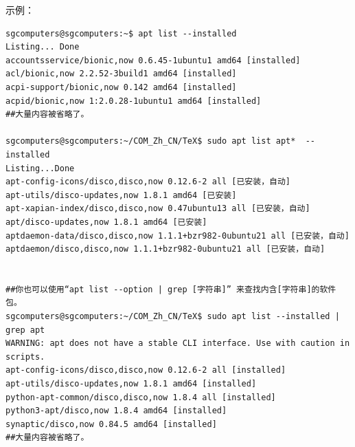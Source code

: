 \documentclass{book}
\begin{document}
示例：
\begin{verbatim}
sgcomputers@sgcomputers:~$ apt list --installed
Listing... Done
accountsservice/bionic,now 0.6.45-1ubuntu1 amd64 [installed]
acl/bionic,now 2.2.52-3build1 amd64 [installed]
acpi-support/bionic,now 0.142 amd64 [installed]
acpid/bionic,now 1:2.0.28-1ubuntu1 amd64 [installed]
##大量内容被省略了。

sgcomputers@sgcomputers:~/COM_Zh_CN/TeX$ sudo apt list apt*  --installed 
Listing...Done
apt-config-icons/disco,disco,now 0.12.6-2 all [已安装，自动]
apt-utils/disco-updates,now 1.8.1 amd64 [已安装]
apt-xapian-index/disco,disco,now 0.47ubuntu13 all [已安装，自动]
apt/disco-updates,now 1.8.1 amd64 [已安装]
aptdaemon-data/disco,disco,now 1.1.1+bzr982-0ubuntu21 all [已安装，自动]
aptdaemon/disco,disco,now 1.1.1+bzr982-0ubuntu21 all [已安装，自动]


##你也可以使用“apt list --option | grep [字符串]” 来查找内含[字符串]的软件包。
sgcomputers@sgcomputers:~/COM_Zh_CN/TeX$ sudo apt list --installed | grep apt
WARNING: apt does not have a stable CLI interface. Use with caution in scripts.
apt-config-icons/disco,disco,now 0.12.6-2 all [installed]
apt-utils/disco-updates,now 1.8.1 amd64 [installed]
python-apt-common/disco,disco,now 1.8.4 all [installed]
python3-apt/disco,now 1.8.4 amd64 [installed]
synaptic/disco,now 0.84.5 amd64 [installed]
##大量内容被省略了。
\end{verbatim}
\end{document}
